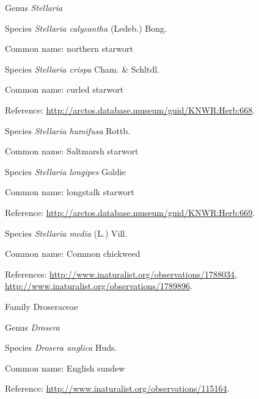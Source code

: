 \documentclass[9pt, article]{memoir}
\begin{document}
\begin{multicols}{2}
\vspace{6pt}\noindent\hspace{30pt}Genus \textit{Stellaria}


\vspace{6pt}\noindent\hspace{36pt}Species \textit{Stellaria calycantha} (Ledeb.) Bong.


Common name: northern starwort

\vspace{6pt}\noindent\hspace{36pt}Species \textit{Stellaria crispa} Cham. \& Schltdl.


Common name: curled starwort

Reference: 
\url{http://arctos.database.museum/guid/KNWR:Herb:668}.

\vspace{6pt}\noindent\hspace{36pt}Species \textit{Stellaria humifusa} Rottb.


Common name: Saltmarsh starwort

\vspace{6pt}\noindent\hspace{36pt}Species \textit{Stellaria longipes} Goldie


Common name: longstalk starwort

Reference: 
\url{http://arctos.database.museum/guid/KNWR:Herb:669}.

\vspace{6pt}\noindent\hspace{36pt}Species \textit{Stellaria media} (L.) Vill.


Common name: Common chickweed

References: 
\url{http://www.inaturalist.org/observations/1788034}, 
\url{http://www.inaturalist.org/observations/1789896}.

\vspace{6pt}\noindent\hspace{24pt}Family Droseraceae


\vspace{6pt}\noindent\hspace{30pt}Genus \textit{Drosera}


\vspace{6pt}\noindent\hspace{36pt}Species \textit{Drosera anglica} Huds.


Common name: English sundew

Reference: 
\url{http://www.inaturalist.org/observations/115164}.


\end{multicols}
\end{document}

